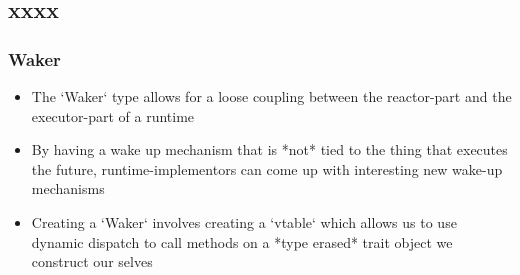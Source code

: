 \subsection{xxxx} %
\begin{frame}[fragile]
    \frametitle{Waker}
% 
% 
% 
% 
    \begin{itemize}
        \item The `Waker` type allows for a loose coupling between the reactor-part and the executor-part of a runtime
        \item By having a wake up mechanism that is *not* tied to the thing that executes the future, runtime-implementors can come up with interesting new wake-up mechanisms
        \item Creating a `Waker` involves creating a `vtable` which allows us to use dynamic dispatch to call methods on a *type erased* trait object we construct our selves
    \end{itemize}

\end{frame}

